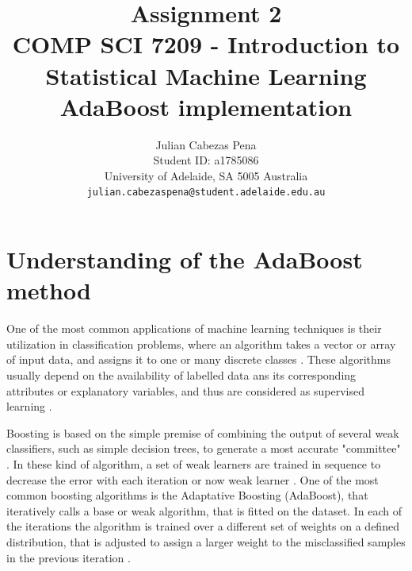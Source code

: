 \documentclass[11pt,twocolumn,letterpaper]{article}
\begin{document}
\title{Assignment 2 \\ COMP SCI 7209 - Introduction to Statistical Machine Learning\\ AdaBoost implementation}

\author{Julian Cabezas Pena\\
Student ID: a1785086\\
University of Adelaide, SA 5005 Australia\\
{\tt\small julian.cabezaspena@student.adelaide.edu.au}
}

\maketitle


\section{Understanding of the AdaBoost method}

One of the most common applications of machine learning techniques is their utilization in classification problems, where an algorithm takes a vector or array of input data, and assigns it to one or many discrete classes \cite{Bishop2006}. These algorithms usually depend on the availability of labelled data ans its corresponding attributes or explanatory variables, and thus are considered as supervised learning \cite{Hastie2009}. 

Boosting is based on the simple premise of combining the output of several weak classifiers, such as simple decision trees, to generate a most accurate "committee" . In these kind of algorithm, a set of weak learners are trained in sequence to decrease the error with each iteration or now weak learner \cite{Hastie2009}. One of the most common boosting algorithms is the Adaptative Boosting (AdaBoost), that iteratively calls a base or weak algorithm, that is fitted on the dataset. In each of the iterations the algorithm is trained over a different set of weights on a defined distribution, that is adjusted to assign a larger weight to the misclassified samples in the previous iteration \cite{Freund1999}.
\end{document}
